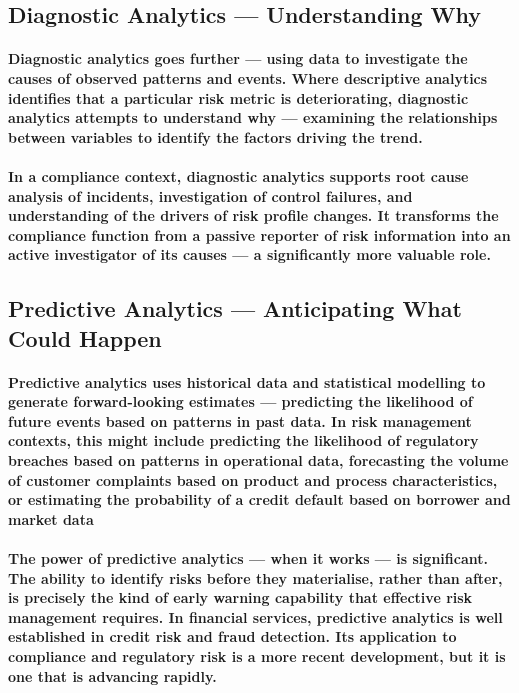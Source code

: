 \subsection{Diagnostic Analytics — Understanding Why}
\paragraph{\textbf{Diagnostic analytics} goes further — using data to investigate the causes of observed patterns and events. Where descriptive analytics identifies that a particular risk metric is deteriorating, diagnostic analytics attempts to understand why — examining the relationships between variables to identify the factors driving the trend.}
\paragraph{In a compliance context, diagnostic analytics supports root cause analysis of incidents, investigation of control failures, and understanding of the drivers of risk profile changes. It transforms the compliance function from a passive reporter of risk information into an active investigator of its causes — a significantly more valuable role.}

\subsection{Predictive Analytics — Anticipating What Could Happen}
\paragraph{\textbf{Predictive analytics} uses historical data and statistical modelling to generate forward-looking estimates — predicting the likelihood of future events based on patterns in past data. In risk management contexts, this might include predicting the likelihood of regulatory breaches based on patterns in operational data, forecasting the volume of customer complaints based on product and process characteristics, or estimating the probability of a credit default based on borrower and market data}
\paragraph{The power of predictive analytics — when it works — is significant. The ability to identify risks before they materialise, rather than after, is precisely the kind of early warning capability that effective risk management requires. In financial services, predictive analytics is well established in credit risk and fraud detection. Its application to compliance and regulatory risk is a more recent development, but it is one that is advancing rapidly.}
